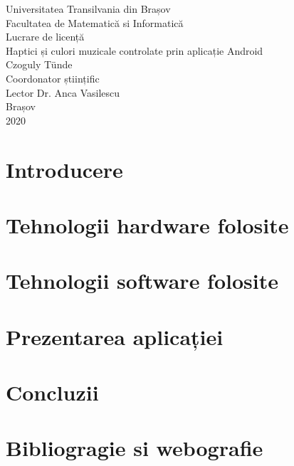 \documentclass[a4paper, 12pt, titlepage]{article}
\begin{document}
\begin{titlepage}
\begin{center}
\vspace*{-3.0cm}
Universitatea Transilvania din Brașov\\Facultatea de Matematică si Informatică
\\
\vspace{5.0cm}
\LARGE Lucrare de licență 
\\
\vspace{0.3cm}
Haptici și culori muzicale controlate prin aplicație Android
\\
\vspace{4.7cm}
\large Czoguly Tünde
\\
\vspace{0.5cm}
Coordonator științific \\  Lector Dr. Anca Vasilescu
\\
\vspace{6.0cm}
\normalsize Brașov\\2020
\end{center} 
\end{titlepage}

\tableofcontents

\newpage

\listoffigures

\newpage

\section{Introducere}


\newpage

\section{Tehnologii hardware folosite}


\newpage

\section{Tehnologii software folosite}


\newpage

\section{Prezentarea aplicației}


\newpage

\section{Concluzii}

\newpage

\section{Bibliogragie si webografie}


\end{document}
